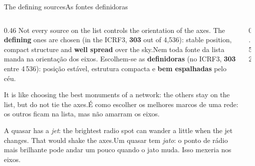 \documentclass[aspectratio=169,11pt]{beamer}
\newcommand{\tr}[2]{\ifEN#2\else#1\fi}
\newcommand{\bnum}[1]{\textbf{\textcolor{mTeal}{#1}}}
\newcommand{\mapaFontes}[1]{\draw[#1] plot[only marks, mark=*, mark size=0.9pt] coordinates {(-0.24,1.50) (-0.14,1.40) (0.38,1.39) (-0.55,1.40) (0.06,1.31) (0.74,1.39) (-0.48,1.29) (0.43,1.27) (-0.95,1.38) (-0.18,1.21) (0.85,1.28) (-0.83,1.25) (0.26,1.17) (1.20,1.34) (-0.50,1.16) (0.76,1.17) (-1.19,1.24) (-0.02,1.10) (1.22,1.21) (-0.87,1.12) (0.53,1.08) (-1.51,1.27) (-0.38,1.04) (1.08,1.10) (-1.25,1.11) (0.21,1.00) (1.56,1.17) (-0.79,1.01) (0.83,1.00) (-1.62,1.13) (-0.18,0.95) (1.41,1.05) (-1.20,1.00) (0.48,0.93) (1.88,1.14) (-0.61,0.91) (1.15,0.94) (-1.61,1.00) (0.07,0.87) (1.74,1.01) (-1.06,0.89) (0.79,0.86) (-1.98,1.03) (-0.38,0.82) (1.47,0.89) (-1.50,0.89) (0.36,0.80) (2.05,0.98) (-0.86,0.80) (1.11,0.80) (-1.92,0.90) (-0.11,0.75) (1.80,0.85) (-1.33,0.78) (0.68,0.73) (-2.30,0.94) (-0.60,0.71) (1.44,0.76) (-1.79,0.79) (0.20,0.68) (2.11,0.82) (-1.10,0.69) (1.01,0.68) (-2.22,0.81) (-0.31,0.64) (1.77,0.71) (-1.60,0.69) (0.53,0.62) (2.42,0.79) (-0.83,0.61) (1.35,0.63) (-2.07,0.69) (0.01,0.57) (2.10,0.68) (-1.36,0.60) (0.87,0.56) (-2.50,0.71) (-0.53,0.54) (1.69,0.58) (-1.86,0.59) (0.35,0.51) (2.42,0.64) (-1.07,0.52) (1.22,0.51) (-2.33,0.60) (-0.20,0.47) (2.03,0.54) (-1.61,0.50) (0.70,0.46) (2.72,0.61) (-0.76,0.44) (1.57,0.47) (-2.11,0.49) (0.14,0.41) (2.35,0.50) (-1.32,0.42) (1.05,0.41) (-2.58,0.50) (-0.43,0.38) (1.91,0.42) (-1.85,0.41) (0.50,0.36) (2.67,0.46) (-1.00,0.35) (1.41,0.35) (-2.36,0.40) (-0.07,0.32) (2.24,0.37) (-1.56,0.33) (0.86,0.30) (-2.82,0.40) (-0.66,0.29) (1.76,0.30) (-2.09,0.31) (0.29,0.26) (2.56,0.32) (-1.23,0.26) (1.22,0.25) (-2.58,0.30) (-0.30,0.23) (2.10,0.25) (-1.79,0.23) (0.65,0.21) (2.86,0.27) (-0.89,0.19) (1.58,0.20) (-2.31,0.21) (0.06,0.17) (2.42,0.20) (-1.46,0.16) (1.02,0.15) (-2.79,0.19) (-0.53,0.13) (1.92,0.14) (-2.01,0.14) (0.43,0.11) (2.73,0.14) (-1.12,0.10) (1.38,0.10) (-2.52,0.10) (-0.16,0.08) (2.25,0.08) (-1.69,0.07) (0.80,0.06) (-2.98,0.07) (-0.76,0.04) (1.73,0.04) (-2.22,0.03) (0.21,0.02) (2.56,0.02) (-1.34,0.01) (1.16,0.00) (-2.71,-0.01) (-0.39,-0.01) (2.06,-0.02) (-1.90,-0.03) (0.58,-0.04) (2.85,-0.06) (-0.99,-0.05) (1.51,-0.06) (-2.41,-0.08) (-0.02,-0.07) (2.37,-0.09) (-1.56,-0.09) (0.94,-0.09) (-2.87,-0.13) (-0.62,-0.11) (1.85,-0.12) (-2.09,-0.14) (0.35,-0.13) (2.66,-0.17) (-1.20,-0.15) (1.29,-0.15) (-2.57,-0.20) (-0.25,-0.16) (2.16,-0.20) (-1.75,-0.19) (0.71,-0.19) (2.91,-0.26) (-0.84,-0.20) (1.62,-0.22) (-2.26,-0.25) (0.12,-0.22) (2.44,-0.28) (-1.40,-0.25) (1.06,-0.25) (-2.71,-0.32) (-0.47,-0.26) (1.93,-0.29) (-1.92,-0.30) (0.48,-0.28) (2.69,-0.37) (-1.04,-0.30) (1.39,-0.32) (-2.40,-0.37) (-0.11,-0.31) (2.21,-0.38) (-1.58,-0.35) (0.82,-0.34) (-2.80,-0.47) (-0.68,-0.35) (1.70,-0.39) (-2.07,-0.42) (0.25,-0.37) (2.46,-0.47) (-1.23,-0.40) (1.15,-0.41) (-2.49,-0.51) (-0.32,-0.41) (1.97,-0.47) (-1.73,-0.47) (0.59,-0.43) (2.65,-0.58) (-0.87,-0.45) (1.45,-0.48) (-2.18,-0.55) (0.03,-0.47) (2.21,-0.57) (-1.38,-0.51) (0.91,-0.50) (-2.54,-0.65) (-0.52,-0.51) (1.72,-0.57) (-1.85,-0.59) (0.36,-0.53) (2.39,-0.68) (-1.04,-0.56) (1.21,-0.58) (-2.24,-0.69) (-0.18,-0.57) (1.95,-0.67) (-1.51,-0.63) (0.68,-0.60) (2.52,-0.81) (-0.69,-0.62) (1.46,-0.66) (-1.91,-0.72) (0.15,-0.63) (2.12,-0.78) (-1.17,-0.68) (0.96,-0.68) (-2.23,-0.84) (-0.36,-0.67) (1.68,-0.76) (-1.58,-0.76) (0.45,-0.70) (2.22,-0.90) (-0.83,-0.73) (1.20,-0.76) (-1.92,-0.87) (-0.05,-0.74) (1.83,-0.87) (-1.25,-0.81) (0.72,-0.78) (-2.15,-1.00) (-0.51,-0.79) (1.39,-0.86) (-1.60,-0.90) (0.24,-0.81) (1.91,-1.00) (-0.93,-0.86) (0.94,-0.87) (-1.84,-1.02) (-0.21,-0.86) (1.52,-0.97) (-1.27,-0.95) (0.49,-0.90) (1.90,-1.13) (-0.62,-0.92) (1.10,-0.97) (-1.52,-1.05) (0.06,-0.94) (1.56,-1.10) (-0.95,-1.00) (0.68,-0.99) (-1.65,-1.19) (-0.33,-0.99) (1.19,-1.09) (-1.19,-1.10) (0.28,-1.03) (1.49,-1.23) (-0.64,-1.07) (0.80,-1.10) (-1.31,-1.22) (-0.08,-1.08) (1.16,-1.21) (-0.86,-1.17) (0.42,-1.13) (-1.28,-1.35) (-0.36,-1.16) (0.80,-1.22) (-0.94,-1.28) (0.10,-1.20) (0.97,-1.35) (-0.52,-1.26) (0.44,-1.27) (-0.83,-1.40) (-0.12,-1.29) (0.58,-1.37) (-0.48,-1.38) (0.14,-1.36) (0.42,-1.48) (-0.10,-1.44)};}
\begin{document}
\begin{frame}{\tr{As fontes definidoras}{The defining sources}}
  \begin{columns}[T]
    \begin{column}{0.46\textwidth}
      \small
      \tr{Nem toda fonte da lista manda na orientação dos eixos. Escolhem-se as \bnum{definidoras}
      (no ICRF3, \bnum{303} entre 4\,536): posição estável, estrutura compacta e \bnum{bem
      espalhadas} pelo céu.}{Not every source on the list controls the orientation of the axes.
      The \bnum{defining} ones are chosen (in the ICRF3, \bnum{303} out of 4,536): stable
      position, compact structure and \bnum{well spread} over the sky.}
      \medskip

      \tr{É como escolher os melhores marcos de uma rede: os outros ficam na lista, mas não
      amarram os eixos.}{It is like choosing the best monuments of a network: the others stay on
      the list, but do not tie the axes.}
      \medskip

      \begin{cuidado}[title={\tr{Por que só os estáveis?}{Why only the stable ones?}}]
        \footnotesize\tr{Um quasar tem \emph{jato}: o ponto de rádio mais brilhante pode andar um pouco quando o jato muda. Isso mexeria nos eixos.}{A quasar has a \emph{jet}: the brightest radio spot can wander a little when the jet changes. That would shake the axes.}
      \end{cuidado}
    \end{column}
    \begin{column}{0.52\textwidth}
      \centering
    \end{column}
  \end{columns}
\end{frame}
\end{document}
